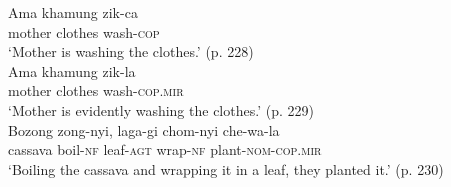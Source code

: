 \begin{exe}
        \ex
        \begin{xlist}
                \ex\label{e:Description:TshanglaPresNonMir}
                \gll Ama khamung zik-ca \\
                mother clothes wash-\textsc{cop} \\
                \glt `Mother is washing the clothes.' (p. 228) \\
                \ex\label{e:Description:TshanglaPresMir}
                \gll Ama khamung zik-la \\
                mother clothes wash-\textsc{cop.mir} \\
                \glt `Mother is evidently washing the clothes.' (p. 229) \\
                \ex\label{e:Description:TshanglaNarrativeNonMir}
                \gll Bozong zong-nyi, laga-gi chom-nyi che-wa-la \\
                cassava boil-\textsc{nf} leaf-\textsc{agt} wrap-\textsc{nf} plant-\textsc{nom}-\textsc{cop.mir} \\
                \glt `Boiling the cassava and wrapping it in a leaf, they planted it.' (p. 230)
        \end{xlist}
        \cite[Tshangla,][]{Andvik2010}
\end{exe}

